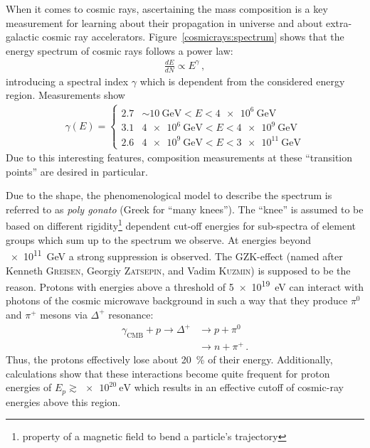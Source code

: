 When it comes to cosmic rays, ascertaining the mass composition is a key measurement for learning about their propagation in universe and about extra-galactic cosmic ray accelerators. Figure~\ref{cosmicrays:spectrum} shows that the energy spectrum of cosmic rays follows a power law:
\begin{align}
\frac{dE}{dN}\propto E^\gamma\,,
\end{align}
introducing a spectral index $\gamma$ which is dependent from the considered energy region. Measurements show \cite{cosmicrays:hoerandel, cosmicrays:fowler}
\begin{align}
	\gamma(E)=
	\begin{cases}
		\num{2.7} & \sim\SI{10}{\giga\electronvolt} < E < \SI{4e6}{\giga\electronvolt}\\
		\num{3.1} & \SI{4e6}{\giga\electronvolt} < E < \SI{4e9}{\giga\electronvolt}\\
		\num{2.6} & \SI{4e9}{\giga\electronvolt} < E < \SI{3e11}{\giga\electronvolt}
	\end{cases}
\end{align}
Due to this interesting features, composition measurements at these \enquote{transition points} are desired in particular.

Due to the shape, the phenomenological model to describe the spectrum is referred to as \textit{poly gonato} (Greek for \enquote{many knees}). The \enquote{knee} is assumed to be based on different rigidity\footnote{property of a magnetic field to bend a particle's trajectory} dependent cut-off energies for sub-spectra of element groups which sum up to the spectrum we observe. \cite{cosmicrays:hoerandel, cosmicrays:shapiro} At energies beyond \SI{e11}{\giga\electronvolt} a strong suppression is observed. The GZK-effect (named after Kenneth \textsc{Greisen}, Georgiy \textsc{Zatsepin}, and Vadim \textsc{Kuzmin}) is supposed to be the reason. Protons with energies above a threshold of \SI{5e19}{\electronvolt} can interact with photons of the cosmic microwave background in such a way that they produce $\pi^0$ and $\pi^+$ mesons via $\Delta^+$ resonance:
\begin{subequations}
	\begin{align}
	\gamma_\text{CMB} + p \rightarrow \Delta^+ &\rightarrow p + \pi^0\\
	&\rightarrow n + \pi^+\,.
	\end{align}
\end{subequations}
Thus, the protons effectively lose about \SI{20}{\percent} of their energy. Additionally, calculations show that these interactions become quite frequent for proton energies of $E_p\gtrsim\SI{e20}{\electronvolt}$ which results in an effective cutoff of cosmic-ray energies above this region. \cite{cosmicrays:gzk}

